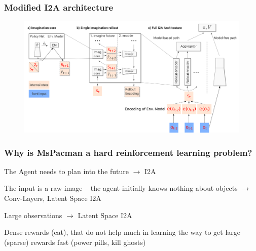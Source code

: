 \begin{frame}
	\frametitle{Modified I2A architecture}
	\begin{figure}
        \centering
        \includegraphics[width=\textwidth]{./latent_i2a_images/latent_i2a_architecture_finished3.png}
    \end{figure}
\end{frame}


\begin{frame}
	\frametitle{Why is MsPacman a hard reinforcement learning problem?}
	\begin{PraesentationAufzaehlung}
		\item The Agent needs to plan into the future $\rightarrow$ I2A
		\item The input is a raw image -- the agent initially knows nothing about objects $\rightarrow$ Conv-Layers, Latent Space I2A
		\item Large observations $\rightarrow$ Latent Space I2A
		\item Dense rewards (eat), that do not help much in learning the way to get large (sparse) rewards fast (power pills, kill ghosts)
	\end{PraesentationAufzaehlung}
\end{frame}

